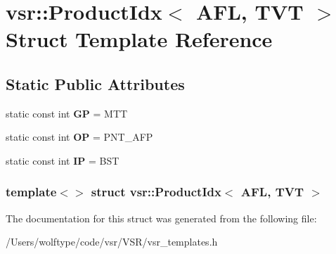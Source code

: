 \hypertarget{structvsr_1_1_product_idx_3_01_a_f_l_00_01_t_v_t_01_4}{\section{vsr\-:\-:Product\-Idx$<$ A\-F\-L, T\-V\-T $>$ Struct Template Reference}
\label{structvsr_1_1_product_idx_3_01_a_f_l_00_01_t_v_t_01_4}
}
\subsection*{Static Public Attributes}
\begin{DoxyCompactItemize}
\item 
\hypertarget{structvsr_1_1_product_idx_3_01_a_f_l_00_01_t_v_t_01_4_a2aac01c9de953d5dfef07b18700ccac4}{static const int {\bfseries G\-P} = M\-T\-T}\label{structvsr_1_1_product_idx_3_01_a_f_l_00_01_t_v_t_01_4_a2aac01c9de953d5dfef07b18700ccac4}

\item 
\hypertarget{structvsr_1_1_product_idx_3_01_a_f_l_00_01_t_v_t_01_4_af220cd370cc8bb74cd30a8af8ecce9c4}{static const int {\bfseries O\-P} = P\-N\-T\-\_\-\-A\-F\-P}\label{structvsr_1_1_product_idx_3_01_a_f_l_00_01_t_v_t_01_4_af220cd370cc8bb74cd30a8af8ecce9c4}

\item 
\hypertarget{structvsr_1_1_product_idx_3_01_a_f_l_00_01_t_v_t_01_4_a3b4567af27cfd646e6b0cfa54927f5e9}{static const int {\bfseries I\-P} = B\-S\-T}\label{structvsr_1_1_product_idx_3_01_a_f_l_00_01_t_v_t_01_4_a3b4567af27cfd646e6b0cfa54927f5e9}

\end{DoxyCompactItemize}
\subsubsection*{template$<$$>$ struct vsr\-::\-Product\-Idx$<$ A\-F\-L, T\-V\-T $>$}



The documentation for this struct was generated from the following file\-:\begin{DoxyCompactItemize}
\item 
/\-Users/wolftype/code/vsr/\-V\-S\-R/vsr\-\_\-templates.\-h\end{DoxyCompactItemize}
